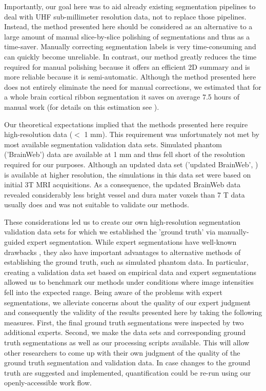 Importantly, our goal here was to aid already existing segmentation pipelines to deal with UHF sub-millimeter resolution data, not to replace those pipelines. Instead, the method presented here should be considered as an alternative to a large amount of manual slice-by-slice polishing of segmentations and thus as a time-saver. Manually correcting segmentation labels is very time-consuming and can quickly become unreliable. In contrast, our method greatly reduces the time required for manual polishing because it offers an efficient 2D summary and is more reliable because it is semi-automatic. Although the method presented here does not entirely eliminate the need for manual corrections, we estimated that for a whole brain cortical ribbon segmentation it saves on average 7.5 hours of manual work (for details on this estimation see ).

Our theoretical expectations implied that the methods presented here require high-resolution data ($<$ 1 mm). This requirement was unfortunately not met by most available segmentation validation data sets. Simulated phantom ('BrainWeb') data \parencite{Collins1998} are available at 1 mm and thus fell short of the resolution required for our purposes. Although an updated data set ('updated BrainWeb', \cite{AubertBroche2006a,AubertBroche2006b}) is available at higher resolution, the simulations in this data set were based on initial 3T MRI acquisitions. As a consequence, the updated BrainWeb data revealed considerably less bright vessel and dura mater voxels than 7 T data usually does and was not suitable to validate our methods.

These considerations led us to create our own high-resolution segmentation validation data sets for which we established the 'ground truth' via manually-guided expert segmentation. While expert segmentations have well-known drawbacks \parencite{Despotovic2015, Valverde2015}, they also have important advantages to alternative methods of establishing the ground truth, such as simulated phantom data. In particular, creating a validation data set based on empirical data and expert segmentations allowed us to benchmark our methods under conditions where image intensities fell into the expected range. Being aware of the problems with expert segmentations, we alleviate concerns about the quality of our expert judgment and consequently the validity of the results presented here by taking the following measures. First, the final ground truth segmentations were inspected by two additional experts. Second, we make the data sets and corresponding ground truth segmentations as well as our processing scripts available. This will allow other researchers to come up with their own judgment of the quality of the ground truth segmentation and validation data. In case changes to the ground truth are suggested and implemented, quantification could be re-run using our openly-accessible work flow. 

